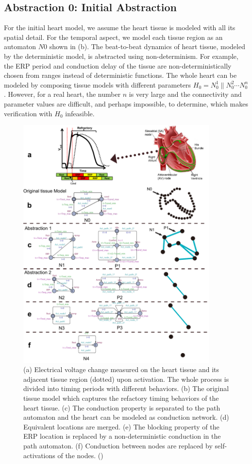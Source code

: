 \subsection{Abstraction 0: Initial Abstraction}
For the initial heart model, we assume the heart tissue is modeled with all its spatial detail. For the temporal aspect, we model each tissue region as an automaton $N0$ shown in (b). The beat-to-beat dynamics of heart tissue, modeled by the deterministic model, is abstracted using non-determinism. For example, the ERP period and conduction delay of the tissue are non-deterministically chosen from ranges instead of deterministic functions. The whole heart can be modeled by composing tissue models with different parameters $H_0=N_0^1\|N_0^2\cdots N_0^n$. However, for a real heart, the number $n$ is very large and the connectivity and parameter values are difficult, and perhaps impossible, to determine, which makes verification with $H_0$ infeasible. 
\begin{figure}[!t]
\center
\includegraphics[width=0.9\textwidth]{figs/Heart_abs.pdf}
\caption{(a) Electrical voltage change measured on the heart tissue and its adjacent tissue region (dotted) upon activation. The whole process is divided into timing periods with different behaviors. (b) The original tissue model which captures the refactory timing behaviors of the heart tissue. (c) The conduction property is separated to the path automaton and the heart can be modeled as conduction network. (d) Equivalent locations are merged. (e) The blocking property of the ERP location is replaced by a non-deterministic conduction in the path automaton. (f) Conduction between nodes are replaced by self-activations of the nodes. (\cite{STTT13})}
\label{fig:HM_abs}
\end{figure} 
